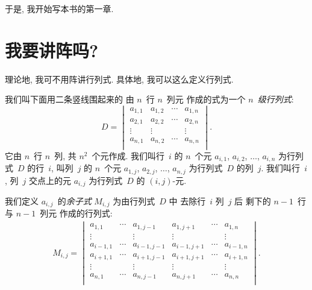 于是, 我开始写本书的第一章.

\section{我要讲阵吗?}

理论地, 我可不用阵讲行列式.
具体地, 我可以这么定义行列式.

\begin{definition}
    我们叫下面用二条竖线围起来的%
    由 \(n\)~行 \(n\)~列元%
    作成的式为一个 \emph{\(n\)~级行列式}:
    \begin{equation}
        D =
        \begin{vmatrix}
            a_{1,1} & a_{1,2} & \cdots & a_{1,n} \\
            a_{2,1} & a_{2,2} & \cdots & a_{2,n} \\
            \vdots  & \vdots  & {}     & \vdots  \\
            a_{n,1} & a_{n,2} & \cdots & a_{n,n} \\
        \end{vmatrix}.
        \label{eq:C0201}
    \end{equation}
    它由 \(n\)~行 \(n\)~列, 共 \(n^2\)~个元作成.
    我们叫行~\(i\) 的 \(n\)~个元
    \(a_{i,1}\), \(a_{i,2}\), \(\dots\), \(a_{i,n}\)
    为行列式~\(D\) 的行~\(i\),
    叫列~\(j\) 的 \(n\)~个元
    \(a_{1,j}\), \(a_{2,j}\), \(\dots\), \(a_{n,j}\)
    为行列式~\(D\) 的列~\(j\).
    我们叫行~\(i\), 列~\(j\) 交点上的元 \(a_{i,j}\)
    为行列式~\(D\) 的 \((i,j)\)-元.

    我们定义 \(a_{i,j}\)~的\emph{余子式} \(M_{i,j}\)
    为由行列式~\(D\) 中%
    去除行~\(i\) 列~\(j\) 后%
    剩下的 \(n-1\)~行与 \(n-1\)~列元%
    作成的行列式:
    \begin{align*}
        M_{i,j} =
        \begin{vmatrix}
            a_{1,1}     & \cdots & a_{1,j-1}   &
            a_{1,j+1}   & \cdots & a_{1,n}       \\
            \vdots      & {}     & \vdots      &
            \vdots      & {}     & \vdots        \\
            a_{i-1,1}   & \cdots & a_{i-1,j-1} &
            a_{i-1,j+1} & \cdots & a_{i-1,n}     \\
            a_{i+1,1}   & \cdots & a_{i+1,j-1} &
            a_{i+1,j+1} & \cdots & a_{i+1,n}     \\
            \vdots      & {}     & \vdots      &
            \vdots      & {}     & \vdots        \\
            a_{n,1}     & \cdots & a_{n,j-1}   &
            a_{n,j+1}   & \cdots & a_{n,n}       \\
        \end{vmatrix}.
    \end{align*}


\end{definition}
